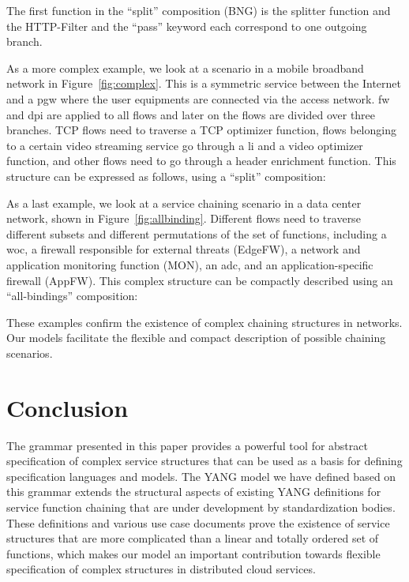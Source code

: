 \documentclass{sig-alternate-per}
\begin{document}
{\scriptsize
\vspace{-8pt}

}
The first function in the ``split'' composition (BNG) is the splitter
function and the HTTP-Filter and the ``pass'' keyword each correspond to one outgoing branch.



As a more complex example, we look at a scenario in a mobile broadband network in
Figure~\ref{fig:complex}.
This is a symmetric service between the Internet and a \ac{pgw} where the user
equipments are connected via the access network. \ac{fw} and \ac{dpi} are
applied to all flows and later on the flows are divided over three branches. 
TCP flows need to traverse a TCP optimizer function, flows belonging to a 
certain video streaming service go through a \ac{li} and a video optimizer function,
and other flows need to go through a header enrichment function. This structure 
can be expressed as follows, using a ``split'' composition:

{\scriptsize
\vspace{-8pt}

}

As a last example, we look at a service chaining scenario in a data center network,
shown in Figure~\ref{fig:allbinding}. Different flows need to traverse different
subsets and different permutations of the set of functions, including a \ac{woc},
a firewall responsible for external threats (EdgeFW), a network and application 
monitoring function (MON), an \ac{adc}, and an application-specific firewall
(AppFW). This complex structure can be compactly described using an ``all-bindings''
composition:

{\scriptsize
\vspace{-8pt}

}
These examples confirm the existence of complex chaining structures in
networks. Our models facilitate the flexible and compact description of possible 
chaining scenarios.














\section{Conclusion}
\label{sec:conclusion}
The grammar presented in this paper provides a powerful tool for abstract 
specification of complex service structures that can be used as a basis for defining 
specification languages and models. The YANG model we have defined based on this 
grammar extends the structural aspects of existing YANG definitions for service 
function chaining that are under development by standardization bodies. These 
definitions and various use case documents prove the existence of service structures
that are more complicated than a linear and totally ordered set of functions, which
makes our model an important contribution towards flexible specification
of complex structures in distributed cloud services. 
\end{document}
